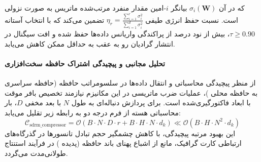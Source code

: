 که در آن $\sigma_i(\mathbf{W})$ بیانگر $i$-امین مقدار منفرد مرتب‌شده ماتریس به صورت نزولی است. نسبت حفظ انرژی طیفی $\eta_r = \frac{\sum_{i=1}^r \sigma_i^2}{\sum_{i=1}^{d} \sigma_i^2}$ تضمین می‌کند که با انتخاب آستانه $\tau \ge 0.90$، بیش از نود درصد از پراکندگی واریانس داده‌ها حفظ شده و افت سیگنال در انتشار گرادیان رو به عقب به حداقل ممکن کاهش می‌یابد.

\paragraph{تحلیل مجانبی و پیچیدگی اشتراک حافظه سخت‌افزاری}
از منظر پیچیدگی محاسباتی و انتقال داده‌ها در سلسومراتب حافظه (حافظه سراسری  به حافظه محلی )، عملیات ضرب ماتریسی در این مکانیزم نیازمند تخصیص بافر موقت با ابعاد فاکتورگیری‌شده است. برای پردازش دنباله‌ای به طول $N$ با بعد مخفی $D$، بار محاسباتی هسته از فرم درجه دو به رابطه زیر تقلیل می‌یابد:
\begin{equation}
\label{eq:complexity_sdrm_compressor}
\mathcal{C}_{\text{sdrm\_compressor}} = \mathcal{O}\left( B \cdot N \cdot D \cdot r + B \cdot H \cdot N \cdot d_k \right) \ll \mathcal{O}\left( B \cdot H \cdot N^2 \cdot d_k \right)
\end{equation}
این بهبود مرتبه پیچیدگی، با کاهش چشمگیر حجم تبادل تانسورها در گذرگاه‌های ارتباطی کارت گرافیک، مانع از اشباع پهنای باند حافظه (پدیده ) در فرآیند استنتاج طولانی‌مدت می‌گردد.
